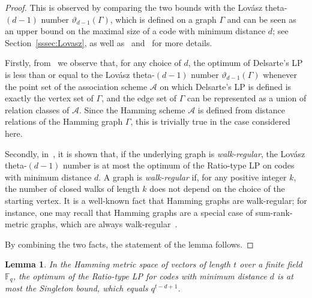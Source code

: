 \documentclass[a4paper]{article}
\newtheorem{lemma}[formula]{Lemma}
\newcommand{\F}{\mathbb{F}}
\begin{document}
\begin{proof} This is observed by comparing the two bounds with the Lov\'asz theta-$(d-1)$ number $\vartheta_{d-1}(\Gamma)$, which is defined on a graph $\Gamma$ and can be seen as an upper bound on the maximal size of a code with minimum distance $d$; see Section~\ref{sssec:Lovasz}, as well as~\cite{Lovasz} and~\cite[Remark 23.1]{AKR2024} for more details.

Firstly, from~\cite{S79} we observe that, for any choice of $d$, the optimum of Delsarte's LP is less than or equal to the Lov\'asz theta-$(d-1)$ number $\vartheta_{d-1}(\Gamma)$ whenever the point set of the association scheme $\mathcal{A}$ on which Delsarte's LP is defined is exactly the vertex set of $\Gamma$, and the edge set of $\Gamma$ can be represented as a union of relation classes of $\mathcal{A}$. Since the Hamming scheme $\mathcal{A}$ is defined from distance relations of the Hamming graph $\Gamma$, this is trivially true in the case considered here. 

Secondly, in~\cite[Section 6]{F2020}, it is shown that, if the underlying graph is \emph{walk-regular}, the Lov\'asz theta-$(d-1)$ number is at most the optimum of the Ratio-type LP on codes with minimum distance $d$. A graph is \emph{walk-regular} if, for any positive integer $k$, the number of closed walks of length $k$ does not depend on the choice of the starting vertex. It is a well-known fact that Hamming graphs are walk-regular; for instance, one may recall that Hamming graphs are a special case of sum-rank-metric graphs, which are always walk-regular~\cite[Proposition 11]{AKR2024}.

By combining the two facts, the statement of the lemma follows.
\end{proof}

\begin{lemma}\label{l:Ham_RT_leq_S}
    In the Hamming metric space of vectors of length $t$ over a finite field $\F_q$, the optimum of the Ratio-type LP for codes with minimum distance $d$ is at most the Singleton bound, which equals $q^{t-d+1}$.
\end{lemma}
\end{document}
